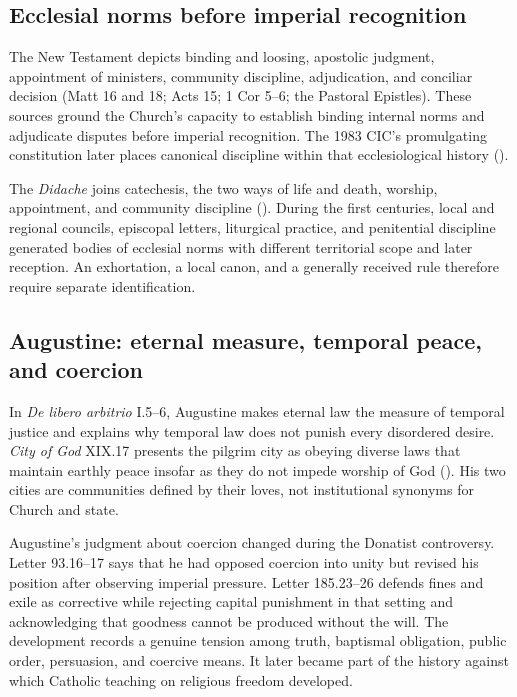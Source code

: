 \subsection{Ecclesial norms before imperial recognition}

The New Testament depicts binding and loosing, apostolic judgment, appointment of ministers, community discipline, adjudication, and conciliar decision (Matt 16 and 18; Acts 15; 1 Cor 5--6; the Pastoral Epistles). These sources ground the Church's capacity to establish binding internal norms and adjudicate disputes before imperial recognition. The 1983 CIC's promulgating constitution later places canonical discipline within that ecclesiological history ().

The \emph{Didache} joins catechesis, the two ways of life and death, worship, appointment, and community discipline (). During the first centuries, local and regional councils, episcopal letters, liturgical practice, and penitential discipline generated bodies of ecclesial norms with different territorial scope and later reception. An exhortation, a local canon, and a generally received rule therefore require separate identification.

\subsection{Augustine: eternal measure, temporal peace, and coercion}

In \emph{De libero arbitrio} I.5--6, Augustine makes eternal law the measure of temporal justice and explains why temporal law does not punish every disordered desire. \emph{City of God} XIX.17 presents the pilgrim city as obeying diverse laws that maintain earthly peace insofar as they do not impede worship of God (). His two cities are communities defined by their loves, not institutional synonyms for Church and state.

Augustine's judgment about coercion changed during the Donatist controversy. Letter 93.16--17 says that he had opposed coercion into unity but revised his position after observing imperial pressure. Letter 185.23--26 defends fines and exile as corrective while rejecting capital punishment in that setting and acknowledging that goodness cannot be produced without the will. The development records a genuine tension among truth, baptismal obligation, public order, persuasion, and coercive means. It later became part of the history against which Catholic teaching on religious freedom developed.

